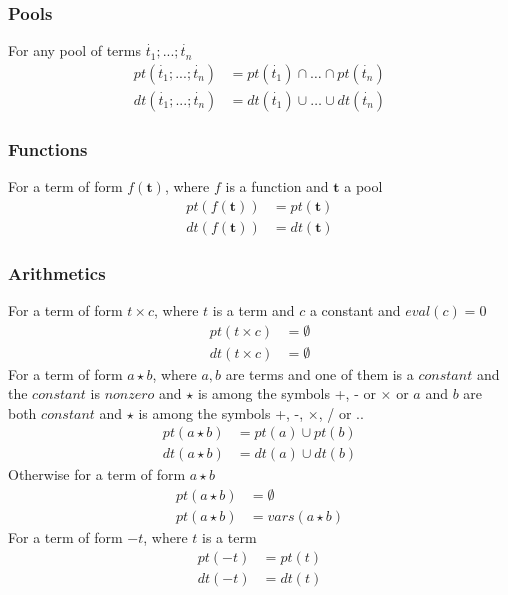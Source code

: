 \documentclass{article}
\newcommand{\pool}[1]{\boldsymbol{#1}}
\newcommand{\tuple}[1]{\dot{#1}}
\begin{document}
	\subsubsection{Pools}
	For any pool of terms $\tuple{t_1};...;\tuple{t_n}$
	\begin{align*}
		pt(\tuple{t_1};...;\tuple{t_n}) &= pt(\tuple{t_1}) \cap \dots \cap pt(\tuple{t_n}) \\
		dt(\tuple{t_1};...;\tuple{t_n}) &= dt(\tuple{t_1}) \cup \dots \cup dt(\tuple{t_n})
	\end{align*}

	\subsubsection{Functions}
	For a term of form $f(\pool{t})$, where $f$ is a function and $\pool{t}$ a pool
	\begin{align*}
		pt(f(\pool{t})) &= pt(\pool{t}) \\
		dt(f(\pool{t})) &= dt(\pool{t})
	\end{align*}
	\subsubsection{Arithmetics}
	For a term of form $t \times c$, where $t$ is a term and $c$ a constant and $\mathit{eval}(c) = 0$
	\begin{align*}
		pt(t \times c) &= \emptyset \\
		dt(t \times c) &= \emptyset
	\end{align*}
	For a term of form $a \star b$, where $a,b$ are terms and one of them is a $\mathit{constant}$ and the $\mathit{constant}$ is $\mathit{nonzero}$ and $\star$ is among the symbols +, - or $\times$ or $a$ and $b$ are both $\mathit{constant}$ and $\star$ is among the symbols +, -, $\times$, / or ..
	\begin{align*}
		pt(a \star b) &= pt(a) \cup pt(b) \\
		dt(a \star b) &= dt(a) \cup dt(b)
	\end{align*}
	Otherwise for a term of form $a \star b$
	\begin{align*}
		pt(a \star b) &= \emptyset \\
		pt(a \star b) &= vars(a \star b)
	\end{align*}
	For a term of form $-t$, where $t$ is a term
	\begin{align*}
		pt(-t) &= pt(t) \\
		dt(-t) &= dt(t)
	\end{align*}
\end{document}
